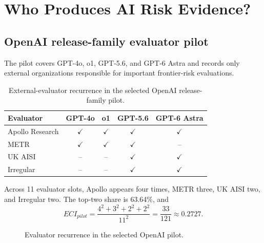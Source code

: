 \documentclass[11pt,twoside]{article}
\begin{document}
\section{Who Produces AI Risk Evidence?}
\subsection{OpenAI release-family evaluator pilot}
The pilot covers GPT-4o, o1, GPT-5.6, and GPT-6 Astra and records only external organizations responsible for important frontier-risk evaluations.

\begin{table}[ht]
\centering\small
\begin{tabular}{lcccc}
\toprule
Evaluator & GPT-4o & o1 & GPT-5.6 & GPT-6 Astra \\
\midrule
Apollo Research & $\checkmark$ & $\checkmark$ & $\checkmark$ & $\checkmark$ \\
METR & $\checkmark$ & $\checkmark$ & $\checkmark$ & -- \\
UK AISI & -- & -- & $\checkmark$ & $\checkmark$ \\
Irregular & -- & -- & $\checkmark$ & $\checkmark$ \\
\bottomrule
\end{tabular}
\caption{External-evaluator recurrence in the selected OpenAI release-family pilot.}
\end{table}

Across 11 evaluator slots, Apollo appears four times, METR three, UK AISI two, and Irregular two. The top-two share is 63.64\%, and
\[
ECI_{pilot}=\frac{4^2+3^2+2^2+2^2}{11^2}=\frac{33}{121}\approx0.2727.
\]

\begin{figure}[ht]
\centering
{}
\caption{Evaluator recurrence in the selected OpenAI pilot.}
\end{figure}
\end{document}
